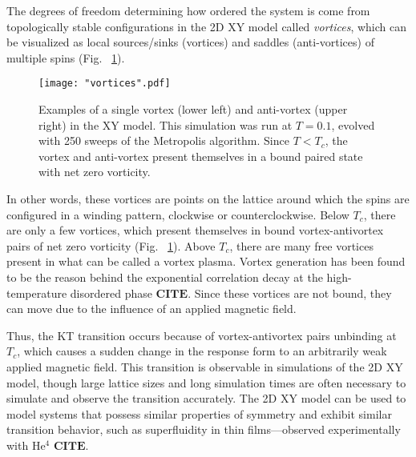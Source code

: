 \documentclass[twocolumn,aps,prl]{revtex4-1} %
\begin{document}
The degrees of freedom determining how ordered the system is come from topologically stable configurations in the 2D XY model called \textit{vortices}, which can be visualized as local sources/sinks (vortices) and saddles (anti-vortices) of multiple spins (Fig.~ \ref{fig:vortices}).
\begin{figure}
	\texttt{[image: "vortices".pdf]}
	\caption{\label{fig:vortices} Examples of a single vortex (lower left) and anti-vortex (upper right) in the XY model. This simulation was run at $T = 0.1$, evolved with 250 sweeps of the Metropolis algorithm. Since $T < T_c$, the vortex and anti-vortex present themselves in a bound paired state with net zero vorticity.}
\end{figure}
In other words, these vortices are points on the lattice around which the spins are configured in a winding pattern, clockwise or counterclockwise. Below $T_c$, there are only a few vortices, which present themselves in bound vortex-antivortex pairs of net zero vorticity (Fig.~ \ref{fig:vortices}). Above $T_c$, there are many free vortices present in what can be called a vortex plasma. Vortex generation has been found to be the reason behind the exponential correlation decay at the high-temperature disordered phase $\textbf{CITE}$. Since these vortices are not bound, they can move due to the influence of an applied magnetic field. 

Thus, the KT transition occurs because of vortex-antivortex pairs unbinding at $T_c$, which causes a sudden change in the response form to an arbitrarily weak applied magnetic field. This transition is observable in simulations of the 2D XY model, though large lattice sizes and long simulation times are often necessary to simulate and observe the transition accurately. The 2D XY model can be used to model systems that possess similar properties of symmetry and exhibit similar transition behavior, such as superfluidity in thin films---observed experimentally with He$^4$ $\textbf{CITE}$.
\end{document}
